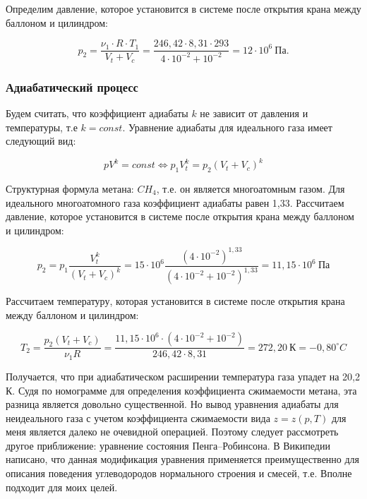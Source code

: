 \documentclass[a4paper,14pt]{article}
\theoremstyle{plain} %
\theoremstyle{definition} %
\theoremstyle{remark} %
\begin{document}
Определим давление, которое установится в системе после открытия крана между баллоном и цилиндром:

\begin{equation}
	p_2 = \frac{\nu_1 \cdot R \cdot T_1}{V_t + V_c} = \frac{246,42 \cdot 8,31 \cdot 293}{4 \cdot 10^{-2} + 10^{-2}} = 12 \cdot 10^6~\textrm{Па}.
\end{equation}

\subsubsection{Адиабатический процесс}

Будем считать, что коэффициент адиабаты $k$ не зависит от давления и температуры, т.е $k = const$. Уравнение адиабаты для идеального газа имеет следующий вид:

\begin{equation}
	p V^k = const \Leftrightarrow p_1 V_t^k = p_2 (V_t + V_c)^k
\end{equation}

Структурная формула метана: $CH_4$, т.е. он является многоатомным газом. Для идеального многоатомного газа коэффициент адиабаты равен 1,33. Рассчитаем давление, которое установится в системе после открытия крана между баллоном и цилиндром:

\begin{equation}
	p_2 = p_1 \frac{V_t^k}{(V_t + V_c)^k} = 15 \cdot 10^6 \frac{(4 \cdot 10^{-2})^{1,33}}{(4 \cdot 10^{-2} + 10^{-2})^{1,33}} = 11,15 \cdot 10^6~\textrm{Па}
\end{equation}

Рассчитаем температуру, которая установится в системе после открытия крана между баллоном и цилиндром:

\begin{equation}
	T_2 = \frac{p_2 (V_t + V_c)}{\nu_1 R} = \frac{11,15 \cdot 10^6 \cdot (4 \cdot 10^{-2} + 10^{-2})}{246,42 \cdot 8,31} = 272,20~\textrm{К} = - 0,80^\circ C
\end{equation}

Получается, что при адиабатическом расширении температура газа упадет на 20,2 К. Судя по номограмме для определения коэффициента сжимаемости метана, эта разница является довольно существенной. Но вывод уравнения адиабаты для неидеального газа с учетом коэффициента сжимаемости вида $z = z (p,T)$ для меня является далеко не очевидной операцией. Поэтому следует рассмотреть другое приближение: уравнение состояния Пенга--Робинсона. В Википедии написано, что данная модификация уравнения применяется преимущественно для описания поведения углеводородов нормального строения и смесей, т.е. Вполне подходит для моих целей.
\end{document}
